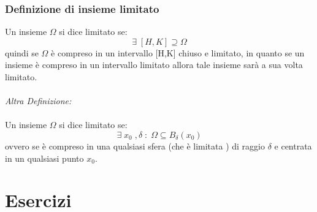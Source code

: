 \documentclass[fontsize = 20px, paper = a4]{article}
\begin{document}
\subsubsection{Definizione di insieme limitato}
Un insieme $\Omega$ si dice limitato se:
$$\exists \; [H,K] \supseteq \Omega$$
quindi se $\Omega$ è compreso in un intervallo [H,K] chiuso e limitato, in quanto se un insieme è compreso in un intervallo limitato allora tale insieme sarà a sua volta limitato.\\\\
\emph{Altra Definizione:}\\ \\
Un insieme $\Omega$ si dice limitato se:
$$\exists \; x_0 \; , \delta \; : \; \Omega \subseteq B_\delta(x_0)$$
ovvero se è compreso in una qualsiasi sfera (che è limitata ) di raggio $\delta$ e centrata in un qualsiasi punto $x_0$.

\section{Esercizi}
\end{document}
